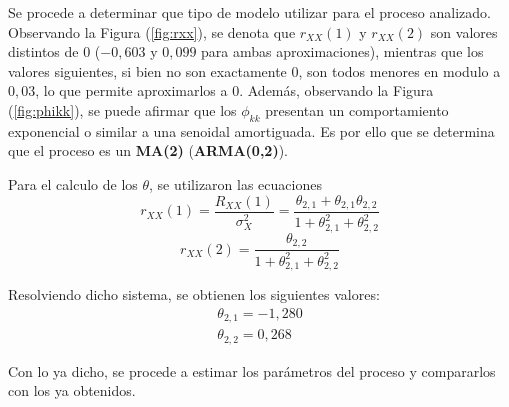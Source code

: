 Se procede a determinar que tipo de modelo utilizar para el proceso analizado. Observando la Figura (\ref{fig:rxx}), se denota que $r_{XX}(1)$ y $r_{XX}(2)$ son valores distintos de 0 ($-0,603$ y $0,099$ para ambas aproximaciones), mientras que los valores siguientes, si bien no son exactamente 0, son todos menores en modulo a $0,03$, lo que permite aproximarlos a 0. Además, observando la Figura (\ref{fig:phikk}), se puede afirmar que los $\phi_{kk}$ presentan un comportamiento exponencial o similar a una senoidal amortiguada. Es por ello que se determina que el proceso es un \textbf{MA(2)} (\textbf{ARMA(0,2)}).

Para el calculo de los $\theta$, se utilizaron las ecuaciones
\begin{equation}
	r_{XX}(1) = \frac{R_{XX}(1)}{\sigma_X^2} = \frac{\theta_{2,1} + \theta_{2,1} \theta_{2,2}}{1 +\theta_{2,1}^2 + \theta_{2,2}^2}
\end{equation}
\begin{equation}
	r_{XX}(2) = \frac{\theta_{2,2}}{1 +\theta_{2,1}^2 + \theta_{2,2}^2}
\end{equation}

Resolviendo dicho sistema, se obtienen los siguientes valores:
\begin{equation}
\begin{gathered}
	\theta_{2,1} = -1,280	\\
	\theta_{2,2} = 0,268	
\end{gathered}
\end{equation}

Con lo ya dicho, se procede a estimar los parámetros del proceso y compararlos con los ya obtenidos.

